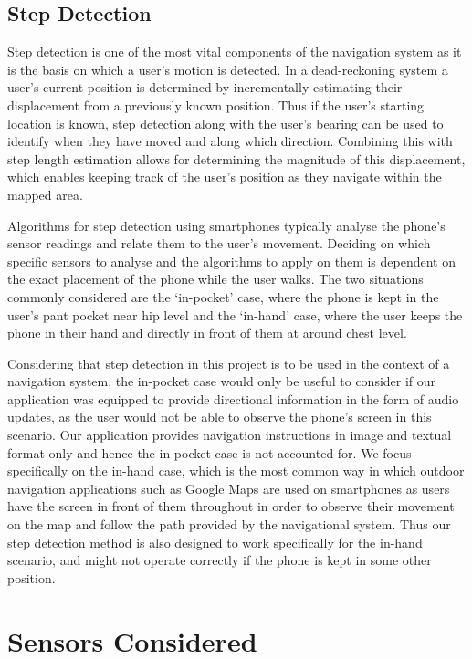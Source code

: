 \documentclass[main.tex]{subfiles}
\begin{document}
\subsection*{Step Detection}

Step detection is one of the most vital components of the navigation system as it is the basis on which a user's motion is detected. In a dead-reckoning system a user's current position is determined by incrementally estimating their displacement from a previously known position. Thus if the user's starting location is known, step detection along with the user's bearing can be used to identify when they have moved and along which direction. Combining this with step length estimation allows for determining the magnitude of this displacement, which enables keeping track of the user's position as they navigate within the mapped area. 

Algorithms for step detection using smartphones typically analyse the phone's sensor readings and relate them to the user's movement. Deciding on which specific sensors to analyse and the algorithms to apply on them is dependent on the exact placement of the phone while the user walks. The two situations commonly considered are the `in-pocket' case, where the phone is kept in the user's pant pocket near hip level and the `in-hand' case, where the user keeps the phone in their hand and directly in front of them at around chest level. 

Considering that step detection in this project is to be used in the context of a navigation system, the in-pocket case would only be useful to consider if our application was equipped to provide directional information in the form of audio updates, as the user would not be able to observe the phone's screen in this scenario. Our application provides navigation instructions in image and textual format only and hence the in-pocket case is not accounted for. We focus specifically on the in-hand case, which is the most common way in which outdoor navigation applications such as Google Maps are used on smartphones as users have the screen in front of them throughout in order to observe their movement on the map and follow the path provided by the navigational system. Thus our step detection method is also designed to work specifically for the in-hand scenario, and might not operate correctly if the phone is kept in some other position.  

\section*{Sensors Considered}
\end{document}
